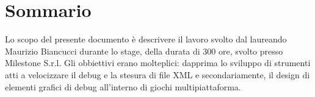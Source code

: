 
\cleardoublepage
{}
{}
\begingroup
\let\clearpage\relax
\let\cleardoublepage\relax
\let\cleardoublepage\relax

\chapter*{Sommario}

Lo scopo del presente documento è descrivere il lavoro svolto dal laureando Maurizio Biancucci durante lo stage, della durata di 300 ore, svolto presso Milestone S.r.l.
Gli obbiettivi erano molteplici: dapprima lo sviluppo di strumenti atti a velocizzare il debug e la stesura di file XML e secondariamente, il design di elementi grafici di debug all'interno di giochi multipiattaforma.

%
%

\endgroup			

\vfill

